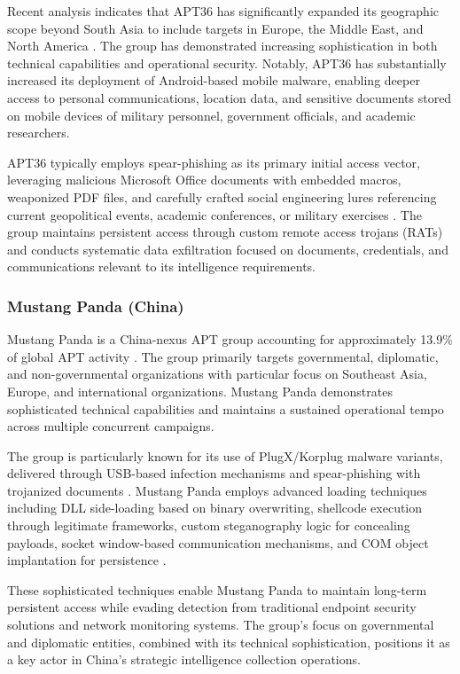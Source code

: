 Recent analysis indicates that APT36 has significantly expanded its geographic scope beyond South Asia to include targets in Europe, the Middle East, and North America \cite{brandefense2025}. The group has demonstrated increasing sophistication in both technical capabilities and operational security. Notably, APT36 has substantially increased its deployment of Android-based mobile malware, enabling deeper access to personal communications, location data, and sensitive documents stored on mobile devices of military personnel, government officials, and academic researchers.

APT36 typically employs spear-phishing as its primary initial access vector, leveraging malicious Microsoft Office documents with embedded macros, weaponized PDF files, and carefully crafted social engineering lures referencing current geopolitical events, academic conferences, or military exercises \cite{brandefense2025}. The group maintains persistent access through custom remote access trojans (RATs) and conducts systematic data exfiltration focused on documents, credentials, and communications relevant to its intelligence requirements.

\subsubsection{Mustang Panda (China)}

Mustang Panda is a China-nexus APT group accounting for approximately 13.9\% of global APT activity \cite{trellix2025}. The group primarily targets governmental, diplomatic, and non-governmental organizations with particular focus on Southeast Asia, Europe, and international organizations. Mustang Panda demonstrates sophisticated technical capabilities and maintains a sustained operational tempo across multiple concurrent campaigns.

The group is particularly known for its use of PlugX/Korplug malware variants, delivered through USB-based infection mechanisms and spear-phishing with trojanized documents \cite{eset2025q2q3}. Mustang Panda employs advanced loading techniques including DLL side-loading based on binary overwriting, shellcode execution through legitimate frameworks, custom steganography logic for concealing payloads, socket window-based communication mechanisms, and COM object implantation for persistence \cite{eset2025q2q3}.

These sophisticated techniques enable Mustang Panda to maintain long-term persistent access while evading detection from traditional endpoint security solutions and network monitoring systems. The group's focus on governmental and diplomatic entities, combined with its technical sophistication, positions it as a key actor in China's strategic intelligence collection operations.

